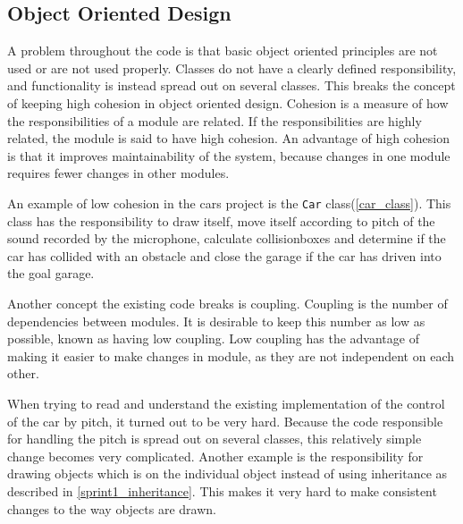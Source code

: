 \subsection{Object Oriented Design}
A problem throughout the code is that basic object oriented principles are not used or are not used properly. 
Classes do not have a clearly defined responsibility, and functionality is instead spread out on several classes. 
This breaks the concept of keeping high cohesion in object oriented design. 
Cohesion is a measure of how the responsibilities of a module are related. 
If the responsibilities are highly related, the module is said to have high cohesion.
An advantage of high cohesion is that it improves maintainability of the system, because changes in one module requires fewer changes in other modules.\cite{OOAD}

An example of low cohesion in the cars project is the \lstinline!Car! class(\cref{car_class}).
This class has the responsibility to draw itself, move itself according to pitch of the sound recorded by the microphone, calculate collisionboxes and determine if the car has collided with an obstacle and close the garage if the car has driven into the goal garage.

Another concept the existing code breaks is coupling.
Coupling is the number of  dependencies between modules.
It is desirable to keep this number as low as possible, known as having low coupling.
Low coupling has the advantage of making it easier to make changes in module, as they are not independent on each other.\cite{OOAD}

When trying to read and understand the existing implementation of the control of the car by pitch, it turned out to be very hard.
Because the code responsible for handling the pitch is spread out on several classes, this relatively simple change becomes very complicated.
Another example is the responsibility for drawing objects which is on the individual object instead of using inheritance as described in \cref{sprint1_inheritance}. 
This makes it very hard to make consistent changes to the way objects are drawn.
